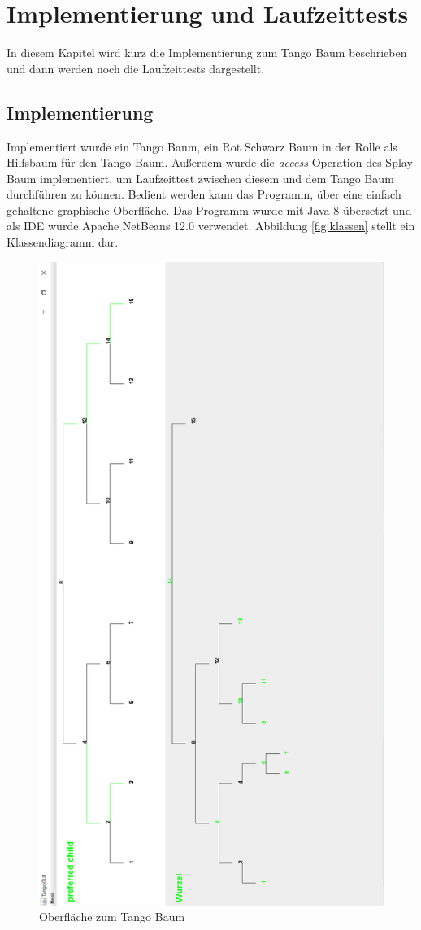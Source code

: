 \documentclass[a4paper,12pt]{article}
\begin{document}
\section{Implementierung und Laufzeittests}
In diesem Kapitel wird kurz die Implementierung zum Tango Baum beschrieben und dann werden noch die Laufzeittests dargestellt. 
\subsection{Implementierung}
Implementiert wurde ein Tango Baum, ein Rot Schwarz Baum in der Rolle als Hilfsbaum für den Tango Baum. Außerdem wurde die \textit{access} Operation des Splay Baum implementiert, um Laufzeittest zwischen diesem und dem Tango Baum durchführen zu können. Bedient werden kann das Programm, über eine einfach gehaltene graphische Oberfläche. Das Programm wurde mit Java 8 übersetzt und als IDE wurde Apache NetBeans 12.0 verwendet. Abbildung \ref{fig:klassen} stellt ein Klassendiagramm dar.
\begin{figure}[H]
	\centering
	\includegraphics[height= 1.7\textwidth]{"Medien/laufzeittest/MainGUI"}
	\caption{Oberfläche zum Tango Baum}
	\label{fig:TangoBaumGui}
\end{figure}
\end{document}
